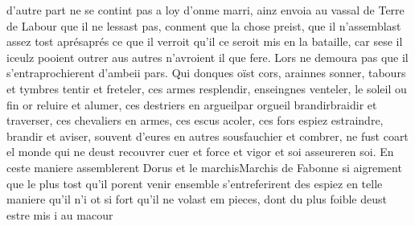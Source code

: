\documentclass{article}
\begin{document}
\begin{pages}
   d’autre part ne se contint pas a loy d’onme marri, ainz envoia au vassal 
   de Terre de Labour que il ne lessast pas, conment que la chose preist, 
   que il n’assemblast assez tost aprésaprés ce que il verroit qu’il 
   ce seroit mis en la bataille, car 
   sese il iceulz pooient outrer aus autres 
   n’avroient il que fere. Lors ne demoura pas que il s’entraprochierent d’ambeii pars. Qui donques oïst cors, arainnes sonner, 
   tabours et tymbres tentir et freteler, ces armes resplendir, enseingnes venteler,
   le soleil ou fin or reluire et alumer, ces destriers en argueilpar orgueil 
   brandirbraidir et traverser, ces chevaliers en armes, ces escus acoler, ces fors espiez estraindre, brandir et aviser, 
   souvent d’eures en autres sousfauchier et combrer, ne fust coart el monde qui ne deust recouvrer cuer 
   et force et vigor 
   et soi asseureren soi. \pend
\pstart En ceste maniere assemblerent Dorus et 
   le marchisMarchis de Fabonne 
   si aigrement que le plus tost qu’il porent venir ensemble s’entreferirent 
   des espiez en telle maniere qu’il n’i ot si fort qu’il ne volast em pieces, dont du plus foible deust estre mis i au macour
   

\end{pages}
\end{document}
